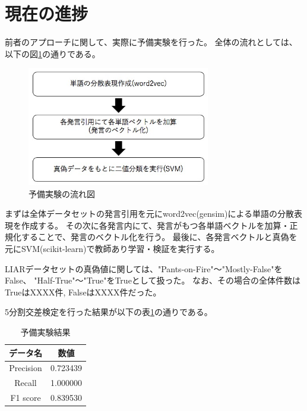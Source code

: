 \documentclass[twocolumn, a4paper, uplatex]{UECIEresume}
\begin{document}
\section{現在の進捗}
前者のアプローチに関して、実際に予備実験を行った。
全体の流れとしては、以下の図\ref{fig:nagare}の通りである。

\begin{figure}[h]
  \begin{center}
    \includegraphics[width=8cm]{fig1.jpg}
    \caption{予備実験の流れ図}
    \label{fig:nagare}
  \end{center}
\end{figure}

まずは全体データセットの発言引用を元にword2vec(gensim)による単語の分散表現を作成する。
その次に各発言内にて、発言がもつ各単語ベクトルを加算・正規化することで、発言のベクトル化を行う。
最後に、各発言ベクトルと真偽を元にSVM(scikit-learn)で教師あり学習・検証を実行する。


LIARデータセットの真偽値に関しては、"Pants-on-Fire"〜"Mostly-False"をFalse、
"Half-True"〜"True"をTrueとして扱った。
なお、その場合の全体件数はTrueはXXXX件, FalseはXXXX件だった。

5分割交差検定を行った結果が以下の表\ref{tb:result}の通りである。

\begin{table}[h]
  \begin{center}
    \caption{予備実験結果}
    \label{tb:result}
    \begin{tabular}{c c}
      \hline
      データ名 & 数値 \\
      \hline \hline
      Precision & 0.723439 \\
      Recall & 1.000000 \\
      F1 score & 0.839530 \\
      \hline
    \end{tabular}
  \end{center}
\end{table}
\end{document}
